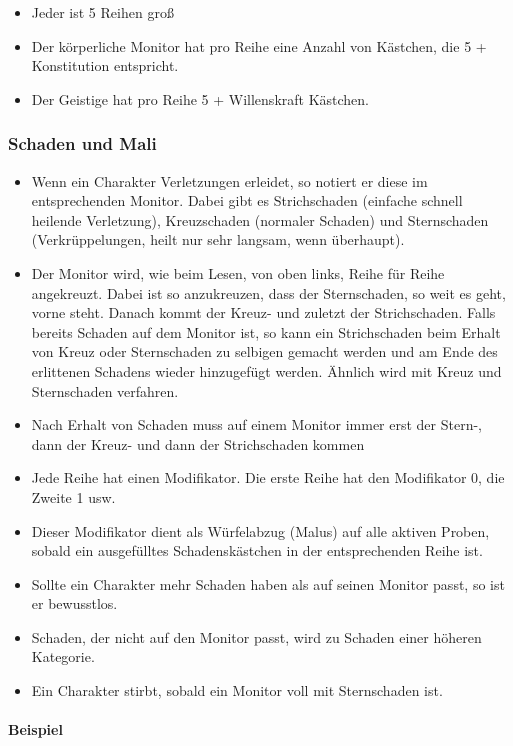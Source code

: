 \documentclass{article}
\begin{document}
\begin{itemize}
\item Jeder ist 5 Reihen groß
\item Der körperliche Monitor hat pro Reihe eine Anzahl von Kästchen, die 5 + Konstitution entspricht.
\item Der Geistige hat pro Reihe 5 + Willenskraft Kästchen.
\end{itemize}

\subsubsection{Schaden und Mali}

\begin{itemize}
\item Wenn ein Charakter Verletzungen erleidet, so notiert er diese im entsprechenden Monitor. Dabei gibt es Strichschaden (einfache schnell heilende Verletzung), Kreuzschaden (normaler Schaden) und Sternschaden (Verkrüppelungen, heilt nur sehr langsam, wenn überhaupt).
\item Der Monitor wird, wie beim Lesen, von oben links, Reihe für Reihe angekreuzt. Dabei ist so anzukreuzen, dass der Sternschaden, so weit es geht, vorne steht. Danach kommt der Kreuz- und zuletzt der Strichschaden. Falls bereits Schaden auf dem Monitor ist, so kann ein Strichschaden beim Erhalt von Kreuz oder Sternschaden zu selbigen gemacht werden und am Ende des erlittenen Schadens wieder hinzugefügt werden. Ähnlich wird mit Kreuz und Sternschaden verfahren.
\item Nach Erhalt von Schaden muss auf einem Monitor immer erst der Stern-, dann der Kreuz- und dann der Strichschaden kommen
\item Jede Reihe hat einen Modifikator. Die erste Reihe hat den Modifikator 0, die Zweite 1 usw.
\item Dieser Modifikator dient als Würfelabzug (Malus) auf alle aktiven Proben, sobald ein ausgefülltes Schadenskästchen in der entsprechenden Reihe ist.
\item Sollte ein Charakter mehr Schaden haben als auf seinen Monitor passt, so ist er bewusstlos.
\item Schaden, der nicht auf den Monitor passt, wird zu Schaden einer höheren Kategorie.
\item Ein Charakter stirbt, sobald ein Monitor voll mit Sternschaden ist.
\end{itemize}

\paragraph{Beispiel}
\end{document}
